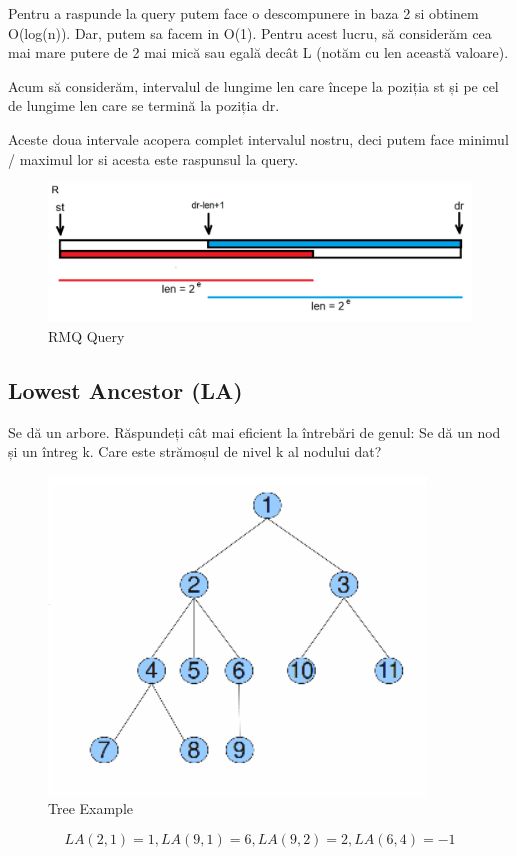 \documentclass[11pt,a4paper]{article}
\theoremstyle{definition}
\theoremstyle{plain}
\theoremstyle{remark}
\begin{document}
Pentru a raspunde la query putem face o descompunere in baza 2 si obtinem O(log(n)). Dar, putem sa facem in O(1).
Pentru acest lucru, să considerăm cea mai mare putere de 2 mai mică sau egală decât L (notăm cu len această valoare).

Acum să considerăm, intervalul de lungime len care începe la poziția st și pe cel de lungime len care se termină la poziția dr.

Aceste doua intervale acopera complet intervalul nostru, deci putem face minimul / maximul lor si acesta este raspunsul la query.

\begin{figure}[H]
    \centering
    \includegraphics[width=0.75\linewidth]{rmq.png}
    \caption{RMQ Query}
    \label{fig:enter-label}
\end{figure}

\subsection{Lowest Ancestor (LA)}
Se dă un arbore. Răspundeți cât mai eficient la întrebări de genul: Se dă un nod și un întreg k. Care este strămoșul de nivel k al nodului dat?

\begin{figure}[H]
    \centering
    \includegraphics[width=0.45\linewidth]{lca-tree.png}
    \caption{Tree Example}
    \label{fig:enter-label}
\end{figure}

$$LA(2,1) = 1, LA(9,1) = 6, LA(9,2) = 2, LA(6,4) = -1$$
\end{document}
